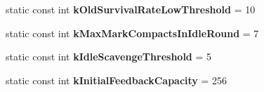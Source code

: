 \begin{DoxyCompactItemize}
\item 
static const int {\bfseries k\+Old\+Survival\+Rate\+Low\+Threshold} = 10\hypertarget{classv8_1_1internal_1_1_heap_ad28aeeea4b3f43d231764a2fa66c3353}{}\label{classv8_1_1internal_1_1_heap_ad28aeeea4b3f43d231764a2fa66c3353}

\item 
static const int {\bfseries k\+Max\+Mark\+Compacts\+In\+Idle\+Round} = 7\hypertarget{classv8_1_1internal_1_1_heap_a7d024d802a5384074ab5251ae5a878b1}{}\label{classv8_1_1internal_1_1_heap_a7d024d802a5384074ab5251ae5a878b1}

\item 
static const int {\bfseries k\+Idle\+Scavenge\+Threshold} = 5\hypertarget{classv8_1_1internal_1_1_heap_a090b852f81d4d726d8b0e7c3b216070c}{}\label{classv8_1_1internal_1_1_heap_a090b852f81d4d726d8b0e7c3b216070c}

\item 
static const int {\bfseries k\+Initial\+Feedback\+Capacity} = 256\hypertarget{classv8_1_1internal_1_1_heap_af54a9564627524915c2cdb3c2be153d0}{}\label{classv8_1_1internal_1_1_heap_af54a9564627524915c2cdb3c2be153d0}

\end{DoxyCompactItemize}
